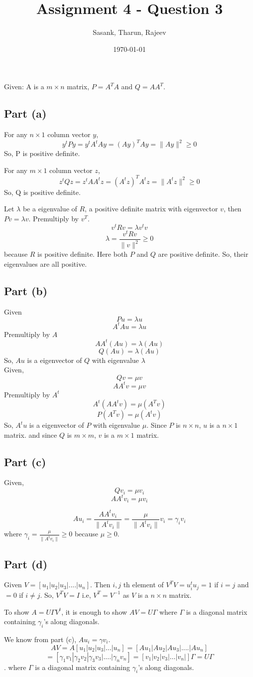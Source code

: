 \documentclass[a4paper]{article}
\begin{document}
\title{Assignment 4 - Question 3}
\author{Sasank, Tharun, Rajeev}
\date{\today}
\maketitle

Given: A is a $m \times n$ matrix, $P = A^TA$ and $Q = AA^T$.

\subsection*{Part (a)}
For any $n \times 1$ column vector $y$,
\[y^tPy = y^tA^t Ay = (Ay)^T Ay = \|Ay\|^2 \geq 0 \]
So, P is positive definite.

For any $m \times 1$ column vector $z$,
\[z^tQz = z^tA A^tz = (A^tz)^T A^tz = \|A^tz\|^2 \geq 0 \]
So, Q is positive definite.

Let $\lambda$ be a eigenvalue of $R$, a positive definite matrix with eigenvector $v$, then $Pv = \lambda v$. Premultiply by $v^T$.
\[v^tRv = \lambda v^t v\]
\[\lambda = \frac{v^tRv}{\|v\|^2} \geq 0\]
because $R$ is positive definite. Here both $P$ and $Q$ are positive definite. So, their eigenvalues are all positive.

\subsection*{Part (b)}
Given 
\[Pu = \lambda u\]
\[A^tAu = \lambda u\]
Premultiply by $A$
\[AA^t(Au) = \lambda (Au)\]
\[Q(Au) = \lambda (Au)\]
So, $Au$ is a eigenvector of $Q$ with eigenvalue $\lambda$
\\[10pt]
Given,
\[Qv = \mu v\]
\[AA^tv = \mu v\]
Premultiply by $A^t$
\[A^t(AA^tv) = \mu (A^Tv)\]
\[P(A^Tv) = \mu (A^tv)\]
So, $A^tu$ is a eigenvector of $P$ with eigenvalue $\mu$. Since $P$ is $n \times n$, $u$ is a $n \times 1$ matrix.
and since $Q$ is $m \times m$, $v$ is a $m \times 1$ matrix.

\subsection*{Part (c)}
Given,
\[Qv_i = \mu v_i\]
\[AA^tv_i = \mu v_i\]

\[Au_i = \frac{AA^tv_i}{\|A^tv_i\|} = \frac{\mu}{\|A^tv_i\|} v_i = \gamma_i v_i \]
where $\gamma_i = \frac{\mu}{\|A^tv_i\|} \geq 0$ because $\mu \geq 0$.

\subsection*{Part (d)}
Given $V = [u_1|u_2|u_3|....|u_n]$.
Then $i,j$ th element of $V^TV = u_i^tu_j = 1$ if $i = j$ and $= 0$ if $i\not=j$.
So, $V^TV = I$ i.e, $V^T = V^{-1}$ as $V$ is a $n \times n $ matrix.

To show $A = U\Gamma V^t$, it is enough to show $AV = U\Gamma$ where $\Gamma$ is a diagonal matrix containing $\gamma_i$'s along diagonals.

We know from part (c),  $Au_i = \gamma v_i$.
\[AV = A[u_1|u_2|u_3|\dots|u_n] = [Au_1|Au_2|Au_3|....|Au_n] \]
\[ = [\gamma_1v_1|\gamma_2v_2|\gamma_3v_3|....|\gamma_nv_n] = [v_1|v_2|v_3|\dots|v_n|]\Gamma = U\Gamma \].
where  $\Gamma$ is a diagonal matrix containing $\gamma_i$'s along diagonals.
\end{document}
